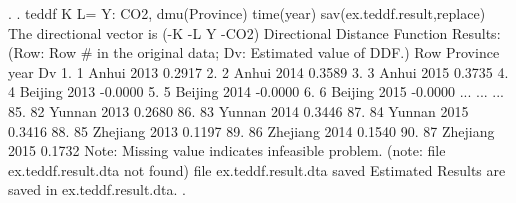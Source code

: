 . 
. teddf K L= Y: CO2, dmu(Province) time(year) sav(ex.teddf.result,replace)
{\smallskip}
 The directional vector is (-K -L Y -CO2)
{\smallskip}
{\smallskip}
  Directional Distance Function Results:
    (Row: Row \# in the original data; Dv: Estimated value of  DDF.)
{\smallskip}
     {\TLC}
     {\VBAR} Row       Province   year        Dv {\VBAR}
     {\LFTT}
  1. {\VBAR}   1          Anhui   2013    0.2917 {\VBAR}
  2. {\VBAR}   2          Anhui   2014    0.3589 {\VBAR}
  3. {\VBAR}   3          Anhui   2015    0.3735 {\VBAR}
  4. {\VBAR}   4        Beijing   2013   -0.0000 {\VBAR}
  5. {\VBAR}   5        Beijing   2014   -0.0000 {\VBAR}
  6. {\VBAR}   6        Beijing   2015   -0.0000 {\VBAR}
                       ...
                       ...
                       ...
 85. {\VBAR}  82         Yunnan   2013    0.2680 {\VBAR}
 86. {\VBAR}  83         Yunnan   2014    0.3446 {\VBAR}
 87. {\VBAR}  84         Yunnan   2015    0.3416 {\VBAR}
 88. {\VBAR}  85       Zhejiang   2013    0.1197 {\VBAR}
 89. {\VBAR}  86       Zhejiang   2014    0.1540 {\VBAR}
 90. {\VBAR}  87       Zhejiang   2015    0.1732 {\VBAR}
     {\BLC}
Note: Missing value indicates infeasible problem.
(note: file ex.teddf.result.dta not found)
file ex.teddf.result.dta saved
{\smallskip}
Estimated Results are saved in ex.teddf.result.dta.
{\smallskip}
. 
